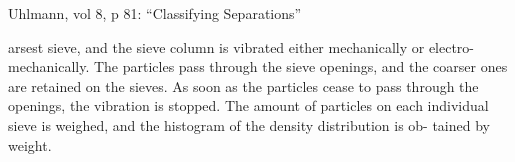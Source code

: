 Uhlmann, vol 8, p 81: ``Classifying Separations''

arsest sieve, and the sieve column is vibrated either mechanically or electro-mechanically. The particles pass through the sieve openings, and the coarser ones are retained on the sieves. As soon as the particles cease to pass through the openings, the vibration is stopped. The amount of particles on each individual sieve is weighed, and the histogram of the density distribution is ob- tained by weight.